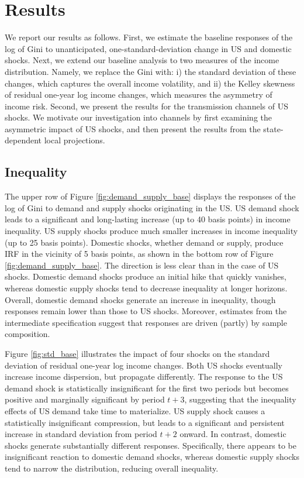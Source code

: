 \documentclass[12pt, a4paper]{article}
\begin{document}
\section{Results}
We report our results as follows. First, we estimate the baseline responses of the log of Gini to unanticipated, one-standard-deviation change in US and domestic shocks. Next, we extend our baseline analysis to two measures of the income distribution. Namely, we replace the Gini with: i) the standard deviation of these changes, which captures the overall income volatility, and ii) the Kelley skewness of residual one-year log income changes, which measures the asymmetry of income risk. Second, we present the results for the transmission channels of US shocks. We motivate our investigation into channels by first examining the asymmetric impact of US shocks, and then present the results from the state-dependent local projections.


\subsection{Inequality}
The upper row of Figure \ref{fig:demand_supply_base} displays the responses of the log of Gini to demand and supply shocks originating in the US. US demand shock leads to a significant and long-lasting increase (up to 40 basis points) in income inequality. US supply shocks produce much smaller increases in income inequality (up to 25 basis points). Domestic shocks, whether demand or supply, produce IRF in the vicinity of 5 basis points, as shown in the bottom row of Figure  \ref{fig:demand_supply_base}. The direction is less clear than in the case of US shocks. Domestic demand shocks produce an initial hike that quickly vanishes, whereas domestic supply shocks tend to decrease inequality at longer horizons. Overall, domestic demand shocks generate an increase in inequality, though responses remain lower than those to US shocks. Moreover, estimates from the intermediate specification suggest that responses are driven (partly) by sample composition. 

Figure \ref{fig:std_base} illustrates the impact of four shocks on the standard deviation of residual one-year log income changes. Both US shocks eventually increase income dispersion, but propagate differently. The response to the US demand shock is statistically insignificant for the first two periods but becomes positive and marginally significant by period $t+3$, suggesting that the inequality effects of US demand take time to materialize. US supply shock causes a statistically insignificant compression, but leads to a significant and persistent increase in standard deviation from period $t+2$ onward. In contrast, domestic shocks generate substantially different responses. Specifically, there appears to be insignificant reaction to domestic demand shocks, whereas domestic supply shocks tend to narrow the distribution, reducing overall inequality.
\end{document}
